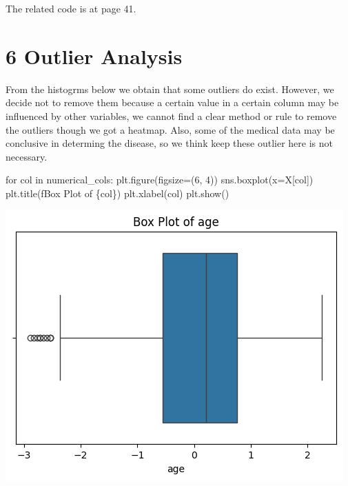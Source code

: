 \documentclass[
  11pt,
  letterpaper,
  DIV=11,
  numbers=noendperiod]{scrartcl}
\newenvironment{Shaded}{\begin{snugshade}}{\end{snugshade}}
\newcommand{\ControlFlowTok}[1]{\textcolor[rgb]{0.00,0.23,0.31}{#1}}
\newcommand{\DecValTok}[1]{\textcolor[rgb]{0.68,0.00,0.00}{#1}}
\newcommand{\KeywordTok}[1]{\textcolor[rgb]{0.00,0.23,0.31}{#1}}
\newcommand{\NormalTok}[1]{\textcolor[rgb]{0.00,0.23,0.31}{#1}}
\newcommand{\OperatorTok}[1]{\textcolor[rgb]{0.37,0.37,0.37}{#1}}
\newcommand{\SpecialCharTok}[1]{\textcolor[rgb]{0.37,0.37,0.37}{#1}}
\newcommand{\SpecialStringTok}[1]{\textcolor[rgb]{0.13,0.47,0.30}{#1}}
\begin{document}
The related code is at page 41.

\section{6 Outlier Analysis}\label{outlier-analysis}

From the histogrms below we obtain that some outliers do exist. However,
we decide not to remove them because a certain value in a certain column
may be influenced by other variables, we cannot find a clear method or
rule to remove the outliers though we got a heatmap. Also, some of the
medical data may be conclusive in determing the disease, so we think
keep these outlier here is not necessary.

\begin{Shaded}
\begin{Highlighting}[]

\ControlFlowTok{for}\NormalTok{ col }\KeywordTok{in}\NormalTok{ numerical\_cols:}
\NormalTok{    plt.figure(figsize}\OperatorTok{=}\NormalTok{(}\DecValTok{6}\NormalTok{, }\DecValTok{4}\NormalTok{))}
\NormalTok{    sns.boxplot(x}\OperatorTok{=}\NormalTok{X[col])}
\NormalTok{    plt.title(}\SpecialStringTok{f\textquotesingle{}Box Plot of }\SpecialCharTok{\{}\NormalTok{col}\SpecialCharTok{\}}\SpecialStringTok{\textquotesingle{}}\NormalTok{)}
\NormalTok{    plt.xlabel(col)}
\NormalTok{    plt.show()}
\end{Highlighting}
\end{Shaded}

\includegraphics{Assignment6_Final version_files/figure-pdf/cell-18-output-1.png}
\end{document}
